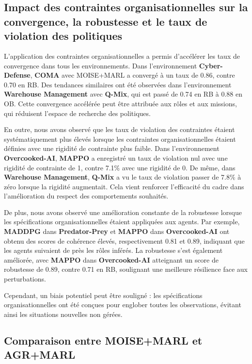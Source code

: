 \documentclass[francais,ROIA,Unicode,manuscript]{cedram}
\begin{document}
\subsection{Impact des contraintes organisationnelles sur la convergence, la robustesse et le taux de violation des politiques}

L'application des contraintes organisationnelles a permis d'accélérer les taux de convergence dans tous les environnements. Dans l'environnement \textbf{Cyber-Defense}, \textbf{COMA} avec MOISE+MARL a convergé à un taux de 0.86, contre 0.70 en RB. Des tendances similaires ont été observées dans l'environnement \textbf{Warehouse Management} avec \textbf{Q-Mix}, qui est passé de 0.74 en RB à 0.88 en OB. Cette convergence accélérée peut être attribuée aux rôles et aux missions, qui réduisent l'espace de recherche des politiques.

En outre, nous avons observé que les taux de violation des contraintes étaient systématiquement plus élevés lorsque les contraintes organisationnelles étaient définies avec une rigidité de contrainte plus faible. Dans l'environnement \textbf{Overcooked-AI}, \textbf{MAPPO} a enregistré un taux de violation nul avec une rigidité de contrainte de 1, contre 7.1\% avec une rigidité de 0. De même, dans \textbf{Warehouse Management}, \textbf{Q-Mix} a vu le taux de violation passer de 7.8\% à zéro lorsque la rigidité augmentait. Cela vient renforcer l'efficacité du cadre dans l'amélioration du respect des comportements souhaités.

De plus, nous avons observé une amélioration constante de la robustesse lorsque les spécifications organisationnelles étaient appliquées aux agents. Par exemple, \textbf{MADDPG} dans \textbf{Predator-Prey} et \textbf{MAPPO} dans \textbf{Overcooked-AI} ont obtenu des scores de cohérence élevés, respectivement 0.81 et 0.89, indiquant que les agents suivaient de près les rôles inférés. La robustesse s'est également améliorée, avec \textbf{MAPPO} dans \textbf{Overcooked-AI} atteignant un score de robustesse de 0.89, contre 0.71 en RB, soulignant une meilleure résilience face aux perturbations.

Cependant, un biais potentiel peut être souligné : les spécifications organisationnelles ont été conçues pour englober toutes les observations, évitant ainsi les situations nouvelles non gérées.

\subsection{Comparaison entre MOISE+MARL et AGR+MARL}
\end{document}
